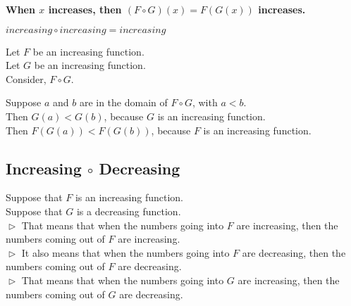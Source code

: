 \documentclass{ximera}
\begin{document}
\begin{center}
\textbf{\textcolor{red!80!black}{When $x$ increases, then $(F \circ G)(x) = F(G(x))$ increases.}}
\end{center}






\begin{fact}
$increasing \circ increasing = increasing$


Let $F$ be an increasing function. \\
Let $G$ be an increasing function. \\


Consider, $F \circ G$.

Suppose $a$ and $b$ are in the domain of $F \circ G$, with $a < b$. \\

Then $G(a) < G(b)$, because $G$ is an increasing function. \\

Then $F(G(a)) < F(G(b))$, because $F$ is an increasing function.


\end{fact}





















\subsection{Increasing $\circ$ Decreasing}


Suppose that $F$ is an increasing function. \\
Suppose that $G$ is a decreasing function. \\


$\vartriangleright$ That means that when the numbers going into $F$ are increasing, then the numbers coming out of $F$ are increasing. \\

$\vartriangleright$ It also means that when the numbers going into $F$ are decreasing, then the numbers coming out of $F$ are decreasing. \\



$\vartriangleright$ That means that when the numbers going into $G$ are increasing, then the numbers coming out of $G$ are decreasing. \\
\end{document}
